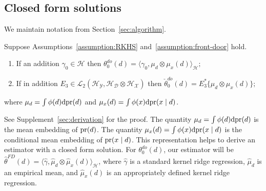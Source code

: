 \subsection{Closed form solutions}

We maintain notation from Section~\ref{sec:algorithm}.

\begin{theorem}\label{theorem:representation_treatment_dag}
Suppose Assumptions~\ref{assumption:RKHS} and~\ref{assumption:front-door} hold.
\begin{enumerate}
    \item If an addition $\gamma_0\in\mathcal{H}$ then
$
\theta_0^{do}(d)=\langle \gamma_0,\mu_d\otimes \mu_{x}(d)\rangle_{\mathcal{H}};
$
    \item If in addition $E_3\in \mathcal{L}_2(\mathcal{H}_{\mathcal{Y}},\mathcal{H}_{\mathcal{D}}\otimes \mathcal{H}_{\mathcal{X}})$ then 
    $
\check{\theta}_0^{do}(d)=E^*_3\{\mu_d\otimes \mu_{x}(d)\};
    $
\end{enumerate}
where $\mu_d=\int \phi(d)\mathrm{d}\text{\normalfont pr}(d)$ and $\mu_{x}(d)=\int \phi(x)\mathrm{d}\text{\normalfont pr}(x \mid d)$. 
\end{theorem}
See Supplement~\ref{sec:derivation} for the proof. The quantity $\mu_d=\int \phi(d)\mathrm{d}\text{\normalfont pr}(d)$ is the mean embedding of $\text{\normalfont pr}(d)$. The quantity $\mu_{x}(d)=\int \phi(x)\mathrm{d}\text{\normalfont pr}(x \mid d)$ is the conditional mean embedding of $\text{\normalfont pr}(x \mid d)$. This representation helps to derive an estimator with a closed form solution. For $\theta_0^{do}(d)$, our estimator will be $\hat{\theta}^{FD}(d)=\langle \hat{\gamma}, \hat{\mu}_d\otimes \hat{\mu}_x(d)\rangle_{\mathcal{H}}$, where $\hat{\gamma}$ is a standard kernel ridge regression, $\hat{\mu}_d$ is an empirical mean, and $\hat{\mu}_x(d)$ is an appropriately defined kernel ridge regression.

